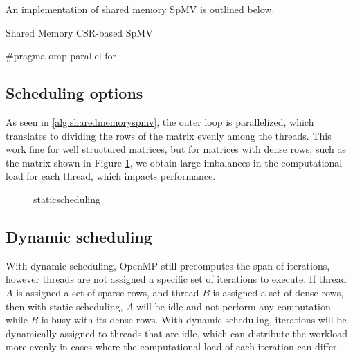 An implementation of shared memory SpMV is outlined below.
\medskip

\begin{algorithm}[H]
    \caption{Shared Memory CSR-based SpMV}
    \SetAlgoVlined

    \#pragma omp parallel for\\
    \label{alg:sharedmemoryspmv}
\end{algorithm}

\subsection{Scheduling options}
\label{sec:schedulingoptions}
As seen in \autoref{alg:sharedmemoryspmv}, the outer loop is parallelized, which translates to dividing the rows of the matrix evenly among the threads. This work fine for well structured matrices, but for matrices with dense rows, such as the matrix shown in Figure \ref{fig:staticscheduling}, we obtain large imbalances in the computational load for each thread, which impacts performance. 

\begin{figure}[H]
    \centering
    \caption{staticscheduling}
    \label{fig:staticscheduling}
\end{figure}

\subsection{Dynamic scheduling}
With dynamic scheduling, OpenMP still precomputes the span of iterations, however threads are not assigned a specific set of iterations to execute. If thread \(A\) is assigned a set of sparse rows, and thread \(B\) is assigned a set of dense rows, then with static scheduling, \(A\) will be idle and not perform any computation while \(B\) is busy with its dense rows. With dynamic scheduling, iterations will be dynamically assigned to threads that are idle, which can distribute the workload more evenly in cases where the computational load of each iteration can differ. 
\medskip

